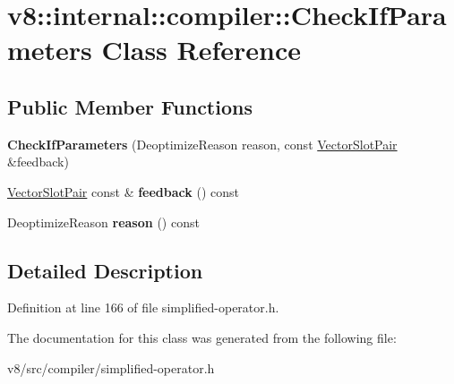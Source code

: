 \hypertarget{classv8_1_1internal_1_1compiler_1_1CheckIfParameters}{}\section{v8\+:\+:internal\+:\+:compiler\+:\+:Check\+If\+Parameters Class Reference}
\label{classv8_1_1internal_1_1compiler_1_1CheckIfParameters}
\subsection*{Public Member Functions}
\begin{DoxyCompactItemize}
\item 
\mbox{\label{classv8_1_1internal_1_1compiler_1_1CheckIfParameters_aa93ca230b892a3a0dfb2bb71d141c54c}} 
{\bfseries Check\+If\+Parameters} (Deoptimize\+Reason reason, const \mbox{\hyperlink{classv8_1_1internal_1_1VectorSlotPair}{Vector\+Slot\+Pair}} \&feedback)
\item 
\mbox{\label{classv8_1_1internal_1_1compiler_1_1CheckIfParameters_a2a683b4b27976b4468c5a11b71967d61}} 
\mbox{\hyperlink{classv8_1_1internal_1_1VectorSlotPair}{Vector\+Slot\+Pair}} const  \& {\bfseries feedback} () const
\item 
\mbox{\label{classv8_1_1internal_1_1compiler_1_1CheckIfParameters_a625d1f717b494f835213231224263ff2}} 
Deoptimize\+Reason {\bfseries reason} () const
\end{DoxyCompactItemize}


\subsection{Detailed Description}


Definition at line 166 of file simplified-\/operator.\+h.



The documentation for this class was generated from the following file\+:\begin{DoxyCompactItemize}
\item 
v8/src/compiler/simplified-\/operator.\+h\end{DoxyCompactItemize}
